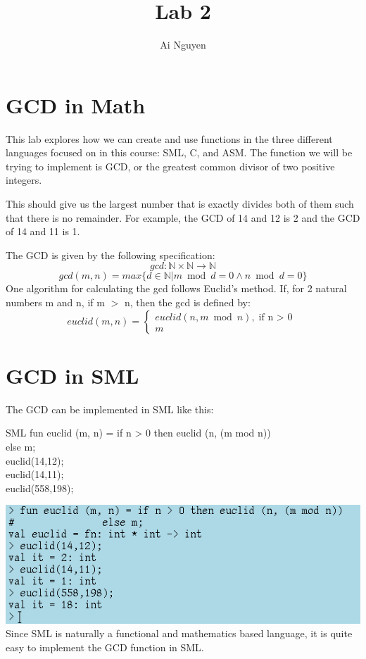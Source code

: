 \documentclass{article}
\begin{document}
\title{Lab 2}
\author{Ai Nguyen}
\maketitle
\clearpage
\section{GCD in Math}
\par This lab explores how we can create and use functions in the three different languages focused on in this course: SML, C, and ASM. The function we will be trying to implement is GCD, or the greatest common divisor of two positive integers.
\par This should give us the largest number that is exactly divides both of them such that there is no remainder. For example, the GCD of 14 and 12 is 2 and the GCD of 14 and 11 is 1.

The GCD is given by the following specification:
\[ gcd: \mathbb{N} \times \mathbb{N} \rightarrow \mathbb{N}\]
\[ gcd(m,n) = max \{d \in \mathbb{N} \vert m \bmod d = 0 \land n \bmod d = 0\}\]
One algorithm for calculating the gcd follows Euclid's method. If, for 2 natural numbers m and n, if m $>$ n, then the gcd is defined by:
\[ euclid(m,n) = \left\{ \begin{array}{l}
                        euclid(n,m \bmod n), \text{if n $>$ 0}\\
                        m
                        \end{array} 
\right. \]
\clearpage
\section{GCD in SML}
The GCD can be implemented in SML like this:
\begin{GFT}{SML}
\+fun euclid (m, n) = if n > 0 then euclid (n, (m mod n))\\
\+		else m;\\
\+euclid(14,12);\\
\+euclid(14,11);\\
\+euclid(558,198);\\
\end{GFT}
\includegraphics[scale = 0.6]{gcd_sml.png}\\
Since SML is naturally a functional and mathematics based language, it is quite easy to implement the GCD function in SML.
\end{document}
